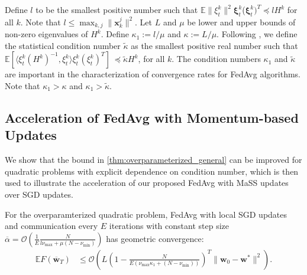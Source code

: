 \begin{comment}
Note that $\mathbb{E}\tilde{H}_{t}^{k}=\frac{1}{n_{k}}\sum_{j=1}^{n_{k}}\mathbf{x}_{k}^{j}(\mathbf{x}_{k}^{j})^{T}=H^{k}$
and $\mathbf{g}_{t,k}=\nabla F_{k}(\mathbf{w}_{t}^{k},\xi_{t}^{k})=\tilde{H}_{t}^{k}(\mathbf{w}_{t}^{k}-\mathbf{w}^{\ast})$
while $\mathbf{g}_{t}=\sum_{k=1}^{N}p_{k}\nabla F_{k}(\mathbf{w}_{t}^{k},\xi_{t}^{k})=\sum_{k=1}^{N}p_{k}\tilde{H}_{t}^{k}(\mathbf{w}_{t}^{k}-\mathbf{w}^{\ast})$.
\end{comment}
Define $l$ to be the smallest positive number such that $\mathbb{E}\|\xi_{t}^{k}\|^{2}$$\mathbf{\xi}_{t}^{k}$($\mathbf{\xi}_{t}^{k})^{T}\preceq lH^{k}$
for all $k$. Note that $l\leq\max_{k,j}\|\mathbf{x}_{k}^{j}\|^{2}$.
Let $L$ and $\mu$ be lower and upper bounds of non-zero eigenvalues
of $H^{k}$. Define $\kappa_{1}:=l/\mu$ and $\kappa:=L/\mu$. Following
\cite{liu2018accelerating,jain2017accelerating}, we define the statistical
condition number $\tilde{\kappa}$ as the smallest positive real number
such that $\mathbb{E}\left[\langle\xi_{t}^{k}(H^{k})^{-1},\xi_{t}^{k}\rangle\xi_{t}^{k}(\xi_{t}^{k})^{T}\right] \  \preceq\tilde{\kappa}H^{k}$, for all $k$. 
The condition numbers $\kappa_{1}$ and $\tilde{\kappa}$
are important in the characterization of convergence rates for FedAvg
algorithms. Note that $\kappa_{1}>\kappa$ and $\kappa_{1}>\tilde{\kappa}$. 

\subsection{Acceleration of FedAvg with Momentum-based Updates}

We show that the bound in \ref{thm:overparameterized_general} can
be improved for quadratic problems with explicit dependence on condition
number, which is then used to illustrate the acceleration of our proposed
FedAvg with MaSS updates over SGD updates.
\begin{theorem}
	\label{thm:overparameterized_quadratic}For the overparamterized quadratic
	problem, FedAvg with local SGD updates and communication every $E$
	iterations with constant step size $\overline{\alpha}=\mathcal{O}(\frac{1}{E}\frac{N}{l\nu_{\max}+\mu(N-\nu_{\min})})$
	has geometric convergence:
	\begin{align*}
	\mathbb{E}F(\overline{\mathbf{w}}_{T}) & \leq\mathcal{O}\left(L(1-\frac{N}{E(\nu_{\max}\kappa_{1}+(N-\nu_{\min}))})^{T}\|\mathbf{w}_{0}-\mathbf{w}^{\ast}\|^{2}\right).
	\end{align*}
\end{theorem}

